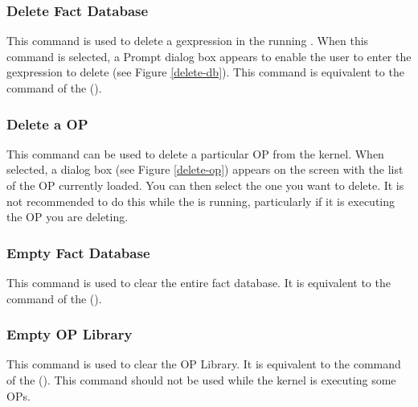 \subsubsection{Delete Fact Database}


This command is used to delete a gexpression in the running \XPK{}.  When this
command is selected, a Prompt dialog box appears to enable the user to enter
the gexpression to delete (see Figure \ref{delete-db}). This command is
equivalent to the  command of the \CPK{}
().

\subsubsection{Delete a OP}


This command can be used to delete a particular OP from the kernel. When
selected, a dialog box (see Figure \ref{delete-op}) appears on the screen with
the list of the OP currently loaded. You can then select the one you want to
delete. It is not recommended to do this while the \XPK{} is running,
particularly if it is executing the OP you are deleting.

\subsubsection{Empty Fact Database}

This command is used to clear the entire fact database. It is
equivalent to the  command of the \CPK{}
().

\subsubsection{Empty OP Library}

This command is used to clear the OP Library. It is
equivalent to the  command of the \CPK{}
(). This command should not be used
while the kernel is executing some OPs.

